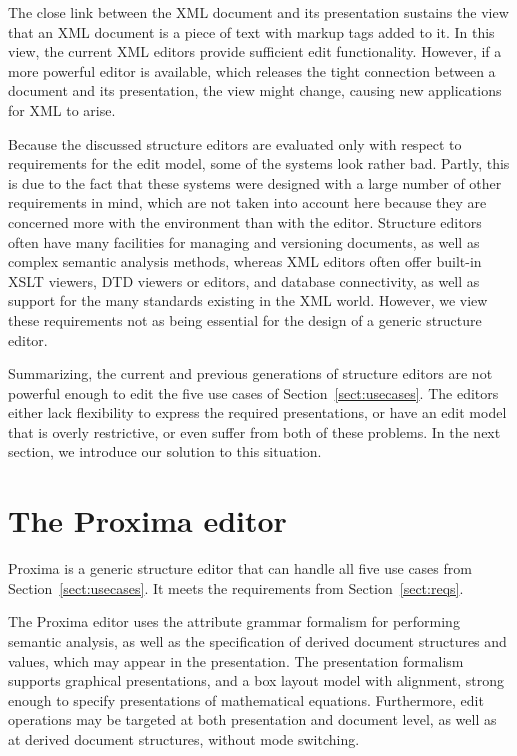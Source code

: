 The close link between the XML document and its presentation sustains the view that an XML document is a piece of text with markup tags added to it. In this view, the current XML editors provide sufficient edit functionality. However, if a more powerful editor is available, which releases the tight connection between a document and its presentation, the view might change, causing new applications for XML to arise.


\bigskip

Because the discussed structure editors are evaluated only with respect to requirements for the edit model, some of the systems look rather bad. Partly, this is due to the fact that these systems were designed with a large number of other requirements in mind, which are not taken into account here because they are concerned more with the environment than with the editor. Structure editors often have many facilities for managing and versioning documents, as well as complex semantic analysis methods, whereas XML editors often offer built-in XSLT viewers, DTD viewers or editors, and database connectivity, as well as support for the many standards existing in the XML world. However, we view these requirements not as being essential for the design of a generic structure editor.

Summarizing, the current and previous generations of structure editors are not powerful enough to edit the five use cases of Section~\ref{sect:usecases}. The editors either lack flexibility to express the required presentations, or have an edit model that is overly restrictive, or even suffer from both of these problems. In the next section, we introduce our solution to this situation.

\section{The Proxima editor}\label{sect:proxEditor}

Proxima is a generic structure editor that can handle all five use cases from Section~\ref{sect:usecases}. It meets the requirements from Section~\ref{sect:reqs}.

The Proxima editor uses the attribute grammar formalism for performing semantic analysis, as well as the specification of derived document structures and values, which may appear in the presentation. The presentation formalism supports graphical presentations, and a box layout model with alignment, strong enough to specify presentations of mathematical equations. Furthermore, edit operations may be targeted at both presentation and document level, as well as at derived document structures, without mode switching.

